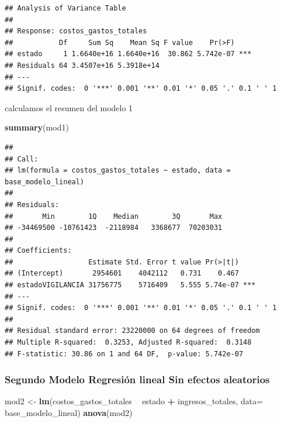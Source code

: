 \documentclass[
  11pt,
]{article}
\newenvironment{Shaded}{\begin{snugshade}}{\end{snugshade}}
\newcommand{\DataTypeTok}[1]{\textcolor[rgb]{0.13,0.29,0.53}{#1}}
\newcommand{\KeywordTok}[1]{\textcolor[rgb]{0.13,0.29,0.53}{\textbf{#1}}}
\newcommand{\NormalTok}[1]{#1}
\newcommand{\OperatorTok}[1]{\textcolor[rgb]{0.81,0.36,0.00}{\textbf{#1}}}
\newcommand{\StringTok}[1]{\textcolor[rgb]{0.31,0.60,0.02}{#1}}
\begin{document}
\begin{verbatim}
## Analysis of Variance Table
## 
## Response: costos_gastos_totales
##           Df     Sum Sq    Mean Sq F value    Pr(>F)    
## estado     1 1.6640e+16 1.6640e+16  30.862 5.742e-07 ***
## Residuals 64 3.4507e+16 5.3918e+14                      
## ---
## Signif. codes:  0 '***' 0.001 '**' 0.01 '*' 0.05 '.' 0.1 ' ' 1
\end{verbatim}

calculamos el resumen del modelo 1

\begin{Shaded}
\begin{Highlighting}[]
\KeywordTok{summary}\NormalTok{(mod1)}
\end{Highlighting}
\end{Shaded}

\begin{verbatim}
## 
## Call:
## lm(formula = costos_gastos_totales ~ estado, data = base_modelo_lineal)
## 
## Residuals:
##       Min        1Q    Median        3Q       Max 
## -34469500 -10761423  -2118984   3368677  70203031 
## 
## Coefficients:
##                  Estimate Std. Error t value Pr(>|t|)    
## (Intercept)       2954601    4042112   0.731    0.467    
## estadoVIGILANCIA 31756775    5716409   5.555 5.74e-07 ***
## ---
## Signif. codes:  0 '***' 0.001 '**' 0.01 '*' 0.05 '.' 0.1 ' ' 1
## 
## Residual standard error: 23220000 on 64 degrees of freedom
## Multiple R-squared:  0.3253, Adjusted R-squared:  0.3148 
## F-statistic: 30.86 on 1 and 64 DF,  p-value: 5.742e-07
\end{verbatim}

\hypertarget{segundo-modelo-regresiuxf3n-lineal-sin-efectos-aleatorios}{%
\subsubsection{Segundo Modelo Regresión lineal Sin efectos
aleatorios}\label{segundo-modelo-regresiuxf3n-lineal-sin-efectos-aleatorios}}

\begin{Shaded}
\begin{Highlighting}[]
\NormalTok{mod2 <-}\StringTok{ }\KeywordTok{lm}\NormalTok{(costos_gastos_totales }\OperatorTok{~}\StringTok{ }\NormalTok{estado }\OperatorTok{+}\StringTok{ }\NormalTok{ingresos_totales, }\DataTypeTok{data=}\NormalTok{ base_modelo_lineal) }
\KeywordTok{anova}\NormalTok{(mod2)}
\end{Highlighting}
\end{Shaded}
\end{document}
